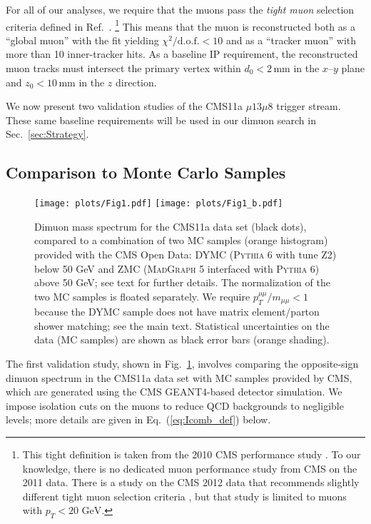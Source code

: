 \documentclass[aps,prd,twocolumn,superscriptaddress,preprintnumbers,nofootinbib,longbibliography,floatfix]{revtex4-1}
\newcommand{\ptmm}{p_T^{\mu\mu}}
\newcommand{\GeV}{\text{~GeV}}
\DeclareRobustCommand{\Sec}[1]{Sec.~\ref{#1}}
\DeclareRobustCommand{\Fig}[1]{Fig.~\ref{#1}}
\DeclareRobustCommand{\Eq}[1]{Eq.~(\ref{#1})}
\DeclareRobustCommand{\Ref}[1]{Ref.~\cite{#1}}
\begin{document}
For all of our analyses, we require that the muons pass the \emph{tight muon} selection criteria defined in \Ref{Chatrchyan:2012xi}.%
%
\footnote{This tight definition is taken from the 2010 CMS performance study \cite{Chatrchyan:2012xi}.  To our knowledge, there is no dedicated muon performance study from CMS on the 2011 data.  There is a study on the CMS 2012 data that recommends slightly different tight muon selection criteria \cite{CMS-DP-2014-020}, but that study is limited to muons with $p_T < 20 \GeV$.}
%
This means that the muon is reconstructed both as a ``global muon'' with the fit yielding $\chi^2/\text{d.o.f.} < 10$ and as a ``tracker muon'' with more than 10 inner-tracker hits.
%
As a baseline IP requirement, the reconstructed muon tracks must intersect the primary vertex within $d_0 < 2$\,mm in the $x$--$y$ plane and $z_0 < 10$\,mm in the $z$ direction.


We now present two validation studies of the CMS11a $\mu13\mu8$ trigger stream.
%
These same baseline requirements will be used in our dimuon search in \Sec{sec:Strategy}.


\subsection{Comparison to Monte Carlo Samples}

\begin{figure}[t]  
\begin{center}  
\texttt{[image: plots/Fig1.pdf]} 
\texttt{[image: plots/Fig1\_b.pdf]} 
\end{center}
\caption{Dimuon mass spectrum for the CMS11a data set (black dots), compared to a combination of two MC samples (orange histogram) provided with the CMS Open Data:
%
DYMC (\textsc{Pythia} 6 with tune Z2) below 50 GeV and ZMC (\textsc{MadGraph} 5 interfaced with \textsc{Pythia} 6) above 50 GeV; see text for further details.
%
The normalization of the two MC samples is floated separately.
%
We require $\ptmm/m_{\mu\mu}<1$ because the DYMC sample does not have matrix element/parton shower matching; see the main text.
%
Statistical uncertainties on the data (MC samples) are shown as black error bars (orange shading). 
}
\label{fig:Fig1}
\end{figure}


The first validation study, shown in \Fig{fig:Fig1}, involves comparing the opposite-sign dimuon spectrum in the CMS11a data set with MC samples provided by CMS, which are generated using the CMS GEANT4-based \cite{Agostinelli:2002hh} detector simulation.
%
We impose isolation cuts on the muons to reduce QCD backgrounds to negligible levels; more details are given in \Eq{eq:Icomb_def} below.
\end{document}
